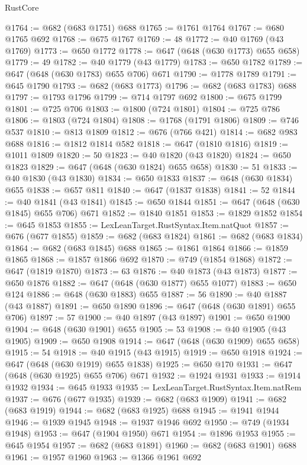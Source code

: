 \begin{lexlean}{RustCore}
\begin{coremodule}
@1764 := @682 (@683 @1751) @688
@1765 := @1761 @1764
@1767 := @680 @1765 @692
@1768 := @675 @1767
@1769 := 48
@1772 := @40 @1769 (@43 @1769)
@1773 := @650 @1772
@1778 := @647 (@648 (@630 @1773) @655 @658)
@1779 := 49
@1782 := @40 @1779 (@43 @1779)
@1783 := @650 @1782
@1789 := @647 (@648 (@630 @1783) @655 @706) @671
@1790 := @1778 @1789
@1791 := @645 @1790
@1793 := @682 (@683 @1773)
@1796 := @682 (@683 @1783) @688
@1797 := @1793 @1796
@1799 := @714 @1797 @692
@1800 := @675 @1799
@1801 := @725 @706
@1803 := @1800 (@724 @1801)
@1804 := @725 @786
@1806 := @1803 (@724 @1804)
@1808 := @1768 (@1791 @1806)
@1809 := @746 @537
@1810 := @813 @1809
@1812 := @676 (@766 @421)
@1814 := @682 @983 @688
@1816 := @1812 @1814 @582
@1818 := @647 (@1810 @1816)
@1819 := @1011 @1809
@1820 := 50
@1823 := @40 @1820 (@43 @1820)
@1824 := @650 @1823
@1829 := @647 (@648 (@630 @1824) @655 @658)
@1830 := 51
@1833 := @40 @1830 (@43 @1830)
@1834 := @650 @1833
@1837 := @648 (@630 @1834) @655
@1838 := @657 @811
@1840 := @647 (@1837 @1838)
@1841 := 52
@1844 := @40 @1841 (@43 @1841)
@1845 := @650 @1844
@1851 := @647 (@648 (@630 @1845) @655 @706) @671
@1852 := @1840 @1851
@1853 := @1829 @1852
@1854 := @645 @1853
@1855 := LexLeanTarget.RustSyntax.Item.natQuot
@1857 := @676 (@677 @1855)
@1859 := @682 (@683 @1824)
@1861 := @682 (@683 @1834)
@1864 := @682 (@683 @1845) @688
@1865 := @1861 @1864
@1866 := @1859 @1865
@1868 := @1857 @1866 @692
@1870 := @749 (@1854 @1868)
@1872 := @647 (@1819 @1870)
@1873 := 63
@1876 := @40 @1873 (@43 @1873)
@1877 := @650 @1876
@1882 := @647 (@648 (@630 @1877) @655 @1077)
@1883 := @650 @124
@1886 := @648 (@630 @1883) @655
@1887 := 56
@1890 := @40 @1887 (@43 @1887)
@1891 := @650 @1890
@1896 := @647 (@648 (@630 @1891) @655 @706)
@1897 := 57
@1900 := @40 @1897 (@43 @1897)
@1901 := @650 @1900
@1904 := @648 (@630 @1901) @655
@1905 := 53
@1908 := @40 @1905 (@43 @1905)
@1909 := @650 @1908
@1914 := @647 (@648 (@630 @1909) @655 @658)
@1915 := 54
@1918 := @40 @1915 (@43 @1915)
@1919 := @650 @1918
@1924 := @647 (@648 (@630 @1919) @655 @1838)
@1925 := @650 @170
@1931 := @647 (@648 (@630 @1925) @655 @706) @671
@1932 := @1924 @1931
@1933 := @1914 @1932
@1934 := @645 @1933
@1935 := LexLeanTarget.RustSyntax.Item.natRem
@1937 := @676 (@677 @1935)
@1939 := @682 (@683 @1909)
@1941 := @682 (@683 @1919)
@1944 := @682 (@683 @1925) @688
@1945 := @1941 @1944
@1946 := @1939 @1945
@1948 := @1937 @1946 @692
@1950 := @749 (@1934 @1948)
@1953 := @647 (@1904 @1950) @671
@1954 := @1896 @1953
@1955 := @645 @1954
@1957 := @682 (@683 @1891)
@1960 := @682 (@683 @1901) @688
@1961 := @1957 @1960
@1963 := @1366 @1961 @692

\end{coremodule}
\end{lexlean}
